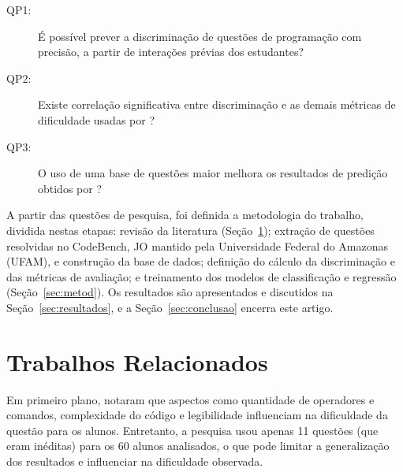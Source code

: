 \documentclass[12pt]{article}
\begin{document}
\begin{description}
    \item [QP1:] É possível prever a discriminação de questões de programação com precisão, a partir de interações prévias dos estudantes?
    \item [QP2:] Existe correlação significativa entre discriminação e as demais métricas de dificuldade usadas por \cite{jackson2023}?
    \item [QP3:] O uso de uma base de questões maior melhora os resultados de predição obtidos por \cite{jackson2023}?    
\end{description}

A partir das questões de pesquisa, foi definida a metodologia do trabalho, dividida nestas etapas: revisão da literatura (Seção~\ref{sec:trab-anteriores}); extração de questões resolvidas no CodeBench, JO mantido pela Universidade Federal do Amazonas (UFAM), e construção da base de dados; definição do cálculo da discriminação e das métricas de avaliação; e treinamento dos modelos de classificação e regressão (Seção~\ref{sec:metod}). Os resultados são apresentados e discutidos na Seção~\ref{sec:resultados}, e a Seção~\ref{sec:conclusao} encerra este artigo.

\section{Trabalhos Relacionados} \label{sec:trab-anteriores}

Em primeiro plano, \cite{whalley2014} notaram que aspectos como quantidade de operadores e comandos, complexidade do código e legibilidade influenciam na dificuldade da questão para os alunos. Entretanto, a pesquisa usou apenas 11 questões (que eram inéditas) para os 60 alunos analisados, o que pode limitar a generalização dos resultados e influenciar na dificuldade observada.
\end{document}
